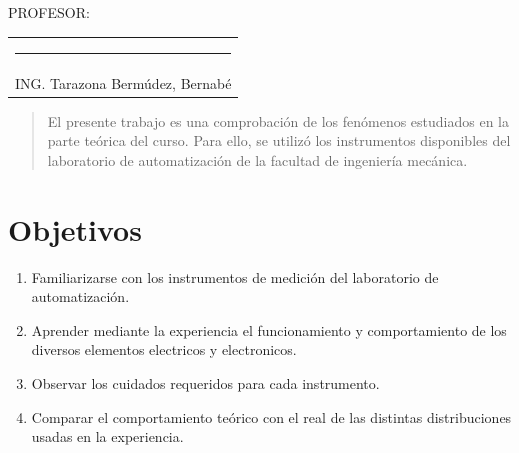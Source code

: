\documentclass[a4paper,12pt]{report}
\begin{document}
{\large PROFESOR:} \\[1.3cm]
\begin{center}
\begin{tabular}{c}
\rule[3pt]{4.8in}{1pt}\\[1pt]
ING. Tarazona Bermúdez, Bernabé
\end{tabular}
\end{center}
\vfill
\newpage
\begin{abstract}
El presente trabajo es una comprobación de los fenómenos estudiados en la parte teórica del curso. Para ello, se utilizó los instrumentos disponibles del laboratorio de automatización de la facultad de ingeniería mecánica.
\end{abstract}
\tableofcontents
\listoffigures
{}
\chapter{Objetivos}
\begin{enumerate}
\item Familiarizarse con los instrumentos de medición del laboratorio de automatización.
\item Aprender mediante la experiencia el funcionamiento y comportamiento de los diversos elementos electricos y electronicos.
\item Observar los cuidados requeridos para cada instrumento.
\item Comparar el comportamiento teórico con el real de las distintas distribuciones usadas en la experiencia.
\end{enumerate}
\setcounter{page}{1}  %
\end{document}
